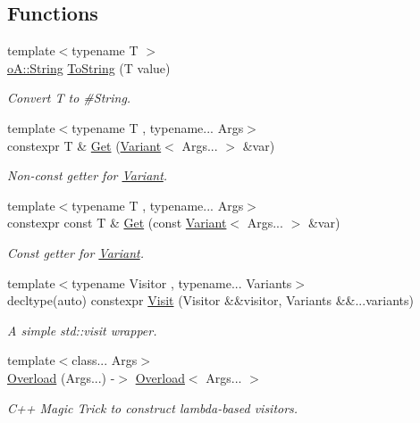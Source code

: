 \subsection*{Functions}
\begin{DoxyCompactItemize}
\item 
{\footnotesize template$<$typename T $>$ }\\\mbox{\hyperlink{classo_a_1_1_string}{o\+A\+::\+String}} \mbox{\hyperlink{namespaceo_a_ab2db5fe904e4be44ffb651930b97d482}{To\+String}} (T value)
\begin{DoxyCompactList}\small\item\em Convert T to \#\+String. \end{DoxyCompactList}\item 
{\footnotesize template$<$typename T , typename... Args$>$ }\\constexpr T \& \mbox{\hyperlink{namespaceo_a_ad005adf81258b6620b273f6b58be4a42}{Get}} (\mbox{\hyperlink{namespaceo_a_a46a1498e4e673b19327a24fac0018867}{Variant}}$<$ Args... $>$ \&var)
\begin{DoxyCompactList}\small\item\em Non-\/const getter for \mbox{\hyperlink{namespaceo_a_a46a1498e4e673b19327a24fac0018867}{Variant}}. \end{DoxyCompactList}\item 
{\footnotesize template$<$typename T , typename... Args$>$ }\\constexpr const T \& \mbox{\hyperlink{namespaceo_a_a1d74fafe5226bbc3bc4bcb41f6f24113}{Get}} (const \mbox{\hyperlink{namespaceo_a_a46a1498e4e673b19327a24fac0018867}{Variant}}$<$ Args... $>$ \&var)
\begin{DoxyCompactList}\small\item\em Const getter for \mbox{\hyperlink{namespaceo_a_a46a1498e4e673b19327a24fac0018867}{Variant}}. \end{DoxyCompactList}\item 
{\footnotesize template$<$typename Visitor , typename... Variants$>$ }\\decltype(auto) constexpr \mbox{\hyperlink{namespaceo_a_a020a0189fb201e2160c2959ddbe0bb7f}{Visit}} (Visitor \&\&visitor, Variants \&\&...variants)
\begin{DoxyCompactList}\small\item\em A simple std\+::visit wrapper. \end{DoxyCompactList}\item 
{\footnotesize template$<$class... Args$>$ }\\\mbox{\hyperlink{namespaceo_a_a503e8d88dbf13dedc19801dafc632979}{Overload}} (Args...) -\/$>$ \mbox{\hyperlink{structo_a_1_1_overload}{Overload}}$<$ Args... $>$
\begin{DoxyCompactList}\small\item\em C++ Magic Trick to construct lambda-\/based visitors. \end{DoxyCompactList}\end{DoxyCompactItemize}
